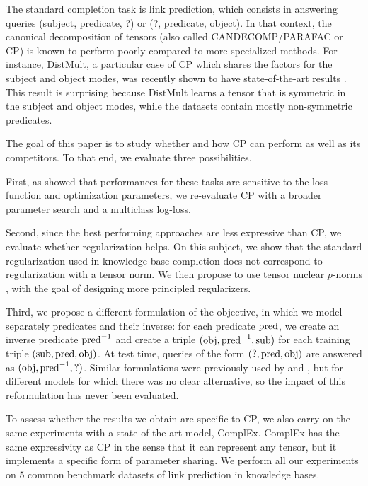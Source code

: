 \documentclass{article}
\newcommand{\CP}{{CP}\xspace}
\newcommand{\complex}{{ComplEx}\xspace}
\newcommand{\distmult}{{DistMult}\xspace}
\begin{document}
The standard completion task is link prediction, which consists in answering queries (subject, predicate, ?) or (?, predicate, object). In that context, the canonical decomposition of tensors (also called CANDECOMP/PARAFAC or \CP) \citep{hitchcock_expression_1927} is known to perform poorly compared to more specialized methods. For instance, \distmult \citep{yang_embedding_2014}, a particular case of \CP which shares the factors for the subject and object modes, was recently shown to have state-of-the-art results \citep{kadlec_knowledge_2017}. This result is surprising because \distmult learns a tensor that is symmetric in the subject and object modes, while the datasets contain mostly non-symmetric predicates.

The goal of this paper is to study whether and how \CP can perform as well as its competitors. To that end, we evaluate three possibilities. 

First, as \citet{kadlec_knowledge_2017} showed that performances for these tasks are sensitive to the loss function and optimization parameters, we re-evaluate \CP with a broader parameter search and a multiclass log-loss. 

Second, since the best performing approaches are less expressive than \CP, we evaluate whether regularization helps. On this subject, we show that the standard regularization used in knowledge base completion does not correspond to regularization with a tensor norm. We then propose to use tensor nuclear $p$-norms \citep{friedland_nuclear_2014}, with the goal of designing more principled regularizers. 

Third, we propose a different formulation of the objective, in which we model separately predicates and their inverse: for each predicate ${\rm pred}$, we create an inverse predicate ${\rm pred}^{-1}$ and create a triple $({\rm obj}, {\rm pred}^{-1}, {\rm sub})$ for each training triple $({\rm sub}, {\rm pred}, {\rm obj})$. At test time, queries of the form $(?, {\rm pred}, {\rm obj})$ are answered as $({\rm obj}, {\rm pred}^{-1}, ?)$. Similar formulations were previously used by \citet{shen2016implicit} and \citet{joulin2017fast}, but for different models for which there was no clear alternative, so the impact of this reformulation has never been evaluated.

To assess whether the results we obtain are specific to \CP, we also carry on the same experiments with a state-of-the-art model, \complex \citep{trouillon_complex_2016}. \complex has the same expressivity as \CP in the sense that it can represent any tensor, but it implements a specific form of parameter sharing. We perform all our experiments on $5$ common benchmark datasets of link prediction in knowledge bases. 
\end{document}

